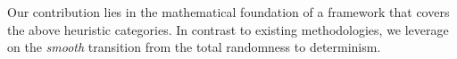\documentclass{ws-ijait}
\newtheorem{property}{Property}
\begin{document}
Our contribution lies in the mathematical foundation of a
framework that covers the above heuristic categories. In
contrast to existing methodologies, we leverage on the
\emph{smooth} transition from the total randomness to
determinism.

%
\end{document}
